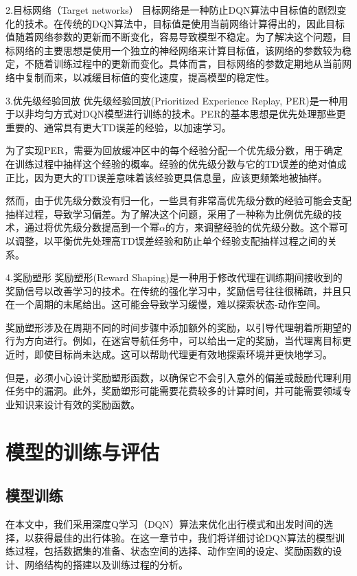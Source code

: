2.目标网络（Target networks）
目标网络是一种防止DQN算法中目标值的剧烈变化的技术。在传统的DQN算法中，目标值是使用当前网络计算得出的，因此目标值随着网络参数的更新而不断变化，容易导致模型不稳定。为了解决这个问题，目标网络的主要思想是使用一个独立的神经网络来计算目标值，该网络的参数较为稳定，不随着训练过程中的更新而变化。具体而言，目标网络的参数定期地从当前网络中复制而来，以减缓目标值的变化速度，提高模型的稳定性。

3.优先级经验回放
优先级经验回放(Prioritized Experience Replay, PER)是一种用于以非均匀方式对DQN模型进行训练的技术。PER的基本思想是优先处理那些更重要的、通常具有更大TD误差的经验，以加速学习。

为了实现PER，需要为回放缓冲区中的每个经验分配一个优先级分数，用于确定在训练过程中抽样这个经验的概率。经验的优先级分数与它的TD误差的绝对值成正比，因为更大的TD误差意味着该经验更具信息量，应该更频繁地被抽样。

然而，由于优先级分数没有归一化，一些具有非常高优先级分数的经验可能会支配抽样过程，导致学习偏差。为了解决这个问题，采用了一种称为比例优先级的技术，通过将优先级分数提高到一个幂$\alpha$的方，来调整经验的优先级分数。这个幂可以调整，以平衡优先处理高TD误差经验和防止单个经验支配抽样过程之间的关系。

4.奖励塑形
奖励塑形(Reward Shaping)是一种用于修改代理在训练期间接收到的奖励信号以改善学习的技术。在传统的强化学习中，奖励信号往往很稀疏，并且只在一个周期的末尾给出。这可能会导致学习缓慢，难以探索状态-动作空间。

奖励塑形涉及在周期不同的时间步骤中添加额外的奖励，以引导代理朝着所期望的行为方向进行。例如，在迷宫导航任务中，可以给出一定的奖励，当代理离目标更近时，即使目标尚未达成。这可以帮助代理更有效地探索环境并更快地学习。

但是，必须小心设计奖励塑形函数，以确保它不会引入意外的偏差或鼓励代理利用任务中的漏洞。此外，奖励塑形可能需要花费较多的计算时间，并可能需要领域专业知识来设计有效的奖励函数。

\section{模型的训练与评估}

\subsection{模型训练}

在本文中，我们采用深度Q学习（DQN）算法来优化出行模式和出发时间的选择，以获得最佳的出行体验。在这一章节中，我们将详细讨论DQN算法的模型训练过程，包括数据集的准备、状态空间的选择、动作空间的设定、奖励函数的设计、网络结构的搭建以及训练过程的分析。

